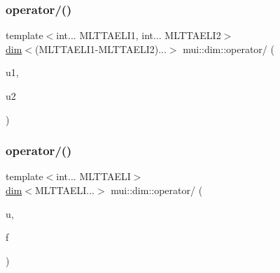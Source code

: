 \subsubsection{\texorpdfstring{operator/()}{operator/()}\hspace{0.1cm}{\footnotesize\ttfamily [2/4]}}
{\footnotesize\ttfamily template$<$int... M\+L\+T\+T\+A\+E\+L\+I1, int... M\+L\+T\+T\+A\+E\+L\+I2$>$ \\
\hyperlink{structmui_1_1dim_1_1dim}{dim}$<$(M\+L\+T\+T\+A\+E\+L\+I1-\/M\+L\+T\+T\+A\+E\+L\+I2)...$>$ mui\+::dim\+::operator/ (\begin{DoxyParamCaption}\item[{const \hyperlink{structmui_1_1dim_1_1dim}{dim}$<$ M\+L\+T\+T\+A\+E\+L\+I1... $>$ \&}]{u1,  }\item[{const \hyperlink{structmui_1_1dim_1_1dim}{dim}$<$ M\+L\+T\+T\+A\+E\+L\+I2... $>$ \&}]{u2 }\end{DoxyParamCaption})\hspace{0.3cm}{\ttfamily [inline]}}

\mbox{\label{namespacemui_1_1dim_a319dd43052003ab564cc2aefd879b543}} 
\subsubsection{\texorpdfstring{operator/()}{operator/()}\hspace{0.1cm}{\footnotesize\ttfamily [3/4]}}
{\footnotesize\ttfamily template$<$int... M\+L\+T\+T\+A\+E\+LI$>$ \\
\hyperlink{structmui_1_1dim_1_1dim}{dim}$<$M\+L\+T\+T\+A\+E\+L\+I...$>$ mui\+::dim\+::operator/ (\begin{DoxyParamCaption}\item[{const \hyperlink{structmui_1_1dim_1_1dim}{dim}$<$ M\+L\+T\+T\+A\+E\+L\+I... $>$ \&}]{u,  }\item[{const double}]{f }\end{DoxyParamCaption})\hspace{0.3cm}{\ttfamily [inline]}}

\mbox{\label{namespacemui_1_1dim_a606f4351b9860a1244749e86547a343c}} 
